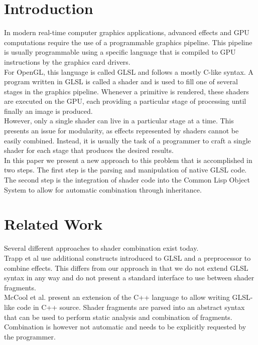 \documentclass{sig-alternate}
\begin{document}
\printccsdesc

\newpage

\section{Introduction}
In modern real-time computer graphics applications, advanced effects and GPU computations require the use of a programmable graphics pipeline. This pipeline is usually programmable using a specific language that is compiled to GPU instructions by the graphics card drivers. \\

For OpenGL, this language is called GLSL\cite{rost2009opengl} and follows a mostly C-like syntax. A program written in GLSL is called a shader and is used to fill one of several stages in the graphics pipeline. Whenever a primitive is rendered, these shaders are executed on the GPU, each providing a particular stage of processing until finally an image is produced. \\

However, only a single shader can live in a particular stage at a time. This presents an issue for modularity, as effects represented by shaders cannot be easily combined. Instead, it is usually the task of a programmer to craft a single shader for each stage that produces the desired results. \\

In this paper we present a new approach to this problem that is accomplished in two steps. The first step is the parsing and manipulation of native GLSL code. The second step is the integration of shader code into the Common Lisp Object System to allow for automatic combination through inheritance.

\section{Related Work}
Several different approaches to shader combination exist today. \\

Trapp et al\cite{trapp2007automated} use additional constructs introduced to GLSL and a preprocessor to combine effects. This differs from our approach in that we do not extend GLSL syntax in any way and do not present a standard interface to use between shader fragments. \\

McCool et al.\cite{mccool2002shader} present an extension of the C++ language to allow writing GLSL-like code in C++ source. Shader fragments are parsed into an abstract syntax that can be used to perform static analysis and combination of fragments. Combination is however not automatic and needs to be explicitly requested by the programmer. \\
\end{document}
